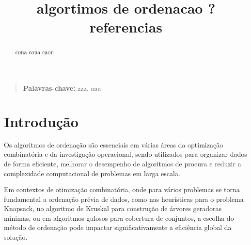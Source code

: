 \documentclass[conference]{IEEEtran}
\begin{document}
\title{algortimos de ordenacao ? referencias}

\author{
\and
{}
}

\maketitle
\thispagestyle{plain}

\begin{abstract}
cona cona caon
\end{abstract}

\begin{quote}
\small
\noindent
\textbf{Palavras-chave:} zzz, aaa
\end{quote}

\IEEEpeerreviewmaketitle

\section{Introdução}

Os algoritmos de ordenação são essenciais em várias áreas da optimização combinatória e da investigação operacional, sendo utilizados para organizar dados de forma eficiente, melhorar o desempenho de algoritmos de procura e reduzir a complexidade computacional de problemas em larga escala.

Em contextos de otimização combinatória, onde para vários problemas se torna fundamental a ordenação prévia de dados, como nas heurísticas para o problema Knapsack, no algoritmo de Kruskal para construção de árvores geradoras mínimas, ou em algoritmos gulosos para cobertura de conjuntos, a escolha do método de ordenação pode impactar significativamente a eficiência global da solução.
\end{document}
